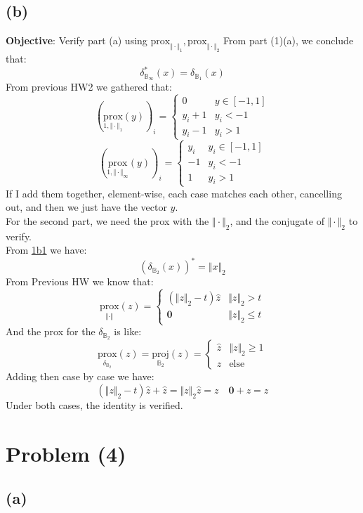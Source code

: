 \documentclass[]{article}
\begin{document}
    \subsection*{(b)}
        \textbf{Objective}: Verify part (a) using $\text{prox}_{\Vert \cdot\Vert_1},\text{prox}_{\Vert \cdot\Vert_2}$
        From part (1)(a), we conclude that: 
        $$
        \delta_{\mathbb{B}_\infty}^*(x) = \delta_{\mathbb{B}_1}(x)
        $$
        From previous HW2 we gathered that: 
        $$
        \left(
            \underset{1, \Vert \cdot\Vert_1}{\text{prox}}(y)
        \right)_i
        =
        \begin{cases}
            0 & y \in [-1, 1]
            \\
            y_i + 1 & y_i < -1
            \\
            y_i - 1 & y_i > 1
        \end{cases}
        $$
        $$
        \left(
            \underset{1, \Vert \cdot\Vert_\infty}{\text{prox}}(y)
        \right)_i
        = 
        \begin{cases}
            y_i & y_i \in [-1, 1] \\
            -1 & y_i < -1 \\
            1 & y_i > 1
        \end{cases}
        $$
        If I add them together, element-wise, each case matches each other, cancelling out, and then we just have the vector $y$. 
        \\
        For the second part, we need the prox with the $\Vert \cdot\Vert_2$, and the conjugate of $\Vert \cdot\Vert_2$ to verify. 
        \\
        From \hyperref[eqn:1b1]{1b1} we have: 
        $$
            (\delta_{\mathbb{B}_2}(x))^* = \Vert x\Vert_2
        $$
        From Previous HW we know that: 
        $$
        \underset{\Vert \cdot\Vert}{\text{prox}}(z) 
        =
        \begin{cases}
            (\Vert z\Vert_2 - t)\widehat{z} & \Vert z\Vert_2 > t 
            \\
            \mathbf{0} & \Vert z\Vert_2 \le t
        \end{cases}
        $$
        And the prox for the $\delta_{\mathbb{B}_2}$ is like: 
        $$
        \underset{\delta_{\mathbb{B}_2}}{\text{prox}}(z) = \underset{\mathbb{B}_2}{\text{proj}} (z)
        = \begin{cases}
            \widehat{z} & \Vert z\Vert_2 \ge 1
            \\
            z & \text{else}
        \end{cases}
        $$
        Adding then case by case we have: 
        $$
        (\Vert z\Vert_2 - t)\widehat{z} + \widehat{z} = \Vert z\Vert_2 \widehat{z} = z \quad \mathbf{0} + z = z
        $$
        Under both cases, the identity is verified. 


\section*{Problem (4)}
    \subsection*{(a)}
    

    
    
    
\end{document}
